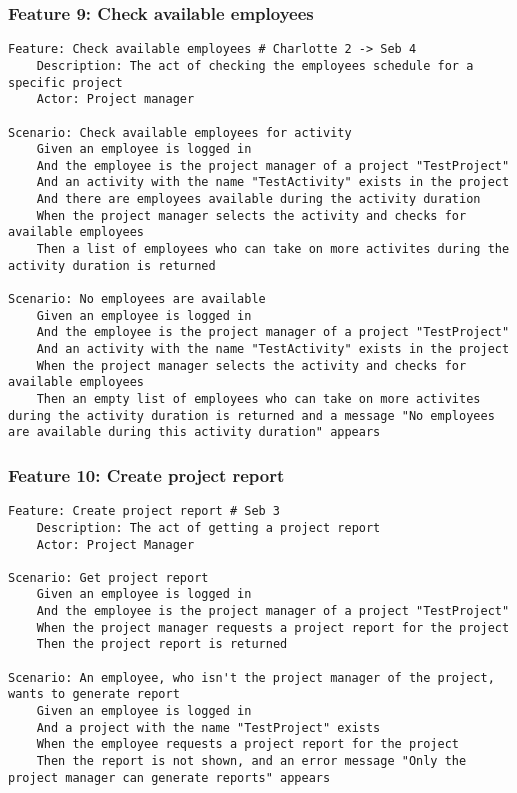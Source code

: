 \subsubsection{Feature 9: Check available employees} %
\begin{lstlisting}
Feature: Check available employees # Charlotte 2 -> Seb 4
    Description: The act of checking the employees schedule for a specific project
    Actor: Project manager

Scenario: Check available employees for activity
    Given an employee is logged in
    And the employee is the project manager of a project "TestProject"
    And an activity with the name "TestActivity" exists in the project
    And there are employees available during the activity duration
    When the project manager selects the activity and checks for available employees
    Then a list of employees who can take on more activites during the activity duration is returned

Scenario: No employees are available
    Given an employee is logged in
    And the employee is the project manager of a project "TestProject"
    And an activity with the name "TestActivity" exists in the project
    When the project manager selects the activity and checks for available employees
    Then an empty list of employees who can take on more activites during the activity duration is returned and a message "No employees are available during this activity duration" appears
\end{lstlisting}


\subsubsection{Feature 10: Create project report} %
\begin{lstlisting}
Feature: Create project report # Seb 3
    Description: The act of getting a project report
    Actor: Project Manager

Scenario: Get project report
    Given an employee is logged in
    And the employee is the project manager of a project "TestProject"
    When the project manager requests a project report for the project
    Then the project report is returned

Scenario: An employee, who isn't the project manager of the project, wants to generate report
    Given an employee is logged in
    And a project with the name "TestProject" exists
    When the employee requests a project report for the project
    Then the report is not shown, and an error message "Only the project manager can generate reports" appears
\end{lstlisting}


